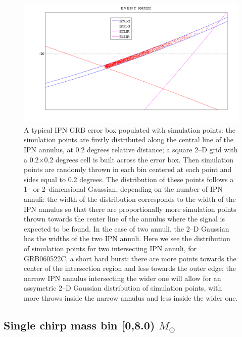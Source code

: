 \begin{figure}[htb]
\begin{center}
\includegraphics[width=32pc]{Images/ipn_simulations.png}
\caption{\label{ipn_simulations} A typical IPN GRB error box populated with simulation points: the simulation points are firstly distributed along the central line of the IPN annulus, at 0.2 degrees relative distance; a square 2--D grid with a 0.2$\times$0.2 degrees cell is built across the error box. Then simulation points are randomly thrown in each   bin centered at each point and sides equal to 0.2 degrees. The distribution of these points follows a 1-- or 2--dimensional Gaussian, depending on the number of IPN annuli: the width of the distribution corresponds to the width of the IPN annulus so that there are proportionally more simulation points thrown towards the center line of the annulus where the signal is expected to be found. In the case of two annuli, the 2--D Gaussian has the widths of the two IPN annuli. Here we see the distribution of simulation points for two intersecting IPN annuli, for GRB060522C, a short hard burst: there are more points towards the center of the intersection region and less towards the outer edge; the narrow IPN annulus intersecting the wider one will allow for an assymetric 2--D Gaussian distribution of simulation points, with more throws inside the narrow annulus and less inside the wider one.}
\end{center}
\end{figure}

\subsection{Single chirp mass bin [0,8.0) $M_{\odot}$}

